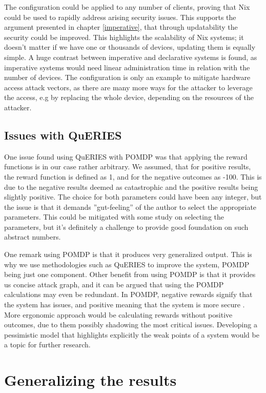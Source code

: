 The configuration could be applied to any number of clients, proving
that Nix could be used to rapidly address arising security
issues. This supports the argument presented in chapter
\ref{imperative}, that through updatability the security could be
improved. This highlights the scalability of Nix systems; it doesn't
matter if we have one or thousands of devices, updating them is
equally simple. A huge contrast between imperative and declarative
systems is found, as imperative systems would need linear
administration time in relation with the number of devices. The
configuration is only an example to mitigate hardware access attack
vectors, as there are many more ways for the attacker to leverage the
access, e.g by replacing the whole device, depending on the resources
of the attacker.

\subsection{Issues with QuERIES} \label{issues}

One issue found using QuERIES with POMDP was that applying the reward
functions is in our case rather arbitrary. We assumed, that for
positive results, the reward function is defined as 1, and for the
negative outcomes as -100. This is due to the negative results deemed as
catastrophic and the positive results being slightly positive. The
choice for both parameters could have been any integer, but the issue
is that it demands ''gut-feeling'' of the author to select the
appropriate parameters. This could be mitigated with some study on
selecting the parameters, but it's definitely a challenge to provide
good foundation on such abstract numbers.

One remark using POMDP is that it produces very generalized
output. This is why we use methodologies such as QuERIES to improve
the system, POMDP being just one component. Other benefit from using
POMDP is that it provides us concise attack graph, and it can be argued that
using the POMDP calculations may even be redundant. In POMDP, negative
rewards signify that the system has issues, and positive meaning that
the system is more secure \cite{mcabeeMarkov}. More ergonomic approach
would be calculating rewards without positive outcomes, due to them
possibly shadowing the most critical issues. Developing a pessimistic
model that highlights explicitly the weak points of a system would be
a topic for further research.

\section{Generalizing the results}

